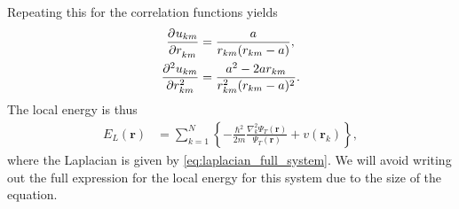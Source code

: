\documentclass[
    a4paper, aps, twocolumn, floatfix, superscriptaddress,
    nofootinbib]{revtex4-1}
\newcommand{\vf}{\mathbf}
\newcommand{\1}{\mathds{1}}
\newcommand{\brac}[1]{\left\{#1\right\}}
\begin{document}
        Repeating this for the correlation functions yields
        \begin{align}
            \dpd[]{u_{km}}{r_{km}}
            &=
            \frac{a}{r_{km}(r_{km} - a)},
            \\
            \dpd[2]{u_{km}}{r_{km}}
            &= \frac{a^2 - 2ar_{km}}{r_{km}^2(r_{km} - a)^2}.
        \end{align}
        The local energy is thus
        \begin{align}
            E_L(\vf{r})
            &=
            \sum_{k = 1}^N
            \brac{
                -\frac{\hbar^2}{2m}
                \frac{\nabla_k^2\Psi_T(\vf{r})}{\Psi_T(\vf{r})}
                + v(\vf{r}_k)
            },
        \end{align}
        where the Laplacian is given by \autoref{eq:laplacian_full_system}.  We
        will avoid writing out the full expression for the local energy for this
        system due to the size of the equation.
\end{document}
